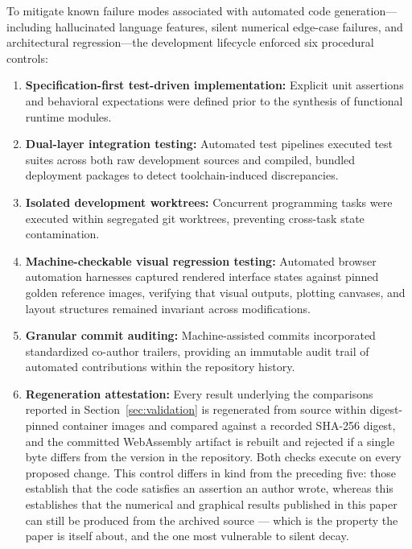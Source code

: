 \documentclass[3p,times,authoryear,twocolumn]{elsarticle}
\begin{document}
To mitigate known failure modes associated with automated code generation—including hallucinated language features, silent numerical edge-case failures, and architectural regression—the development lifecycle enforced six procedural controls:
\begin{enumerate}
\item \textbf{Specification-first test-driven implementation:} Explicit unit assertions and behavioral expectations were defined prior to the synthesis of functional runtime modules.
\item \textbf{Dual-layer integration testing:} Automated test pipelines executed test suites across both raw development sources and compiled, bundled deployment packages to detect toolchain-induced discrepancies.
\item \textbf{Isolated development worktrees:} Concurrent programming tasks were executed within segregated git worktrees, preventing cross-task state contamination.
\item \textbf{Machine-checkable visual regression testing:} Automated browser automation harnesses captured rendered interface states against pinned golden reference images, verifying that visual outputs, plotting canvases, and layout structures remained invariant across modifications.
\item \textbf{Granular commit auditing:} Machine-assisted commits incorporated standardized co-author trailers, providing an immutable audit trail of automated contributions within the repository history.
\item \textbf{Regeneration attestation:} Every result underlying the comparisons reported in Section~\ref{sec:validation} is regenerated from source within digest-pinned container images and compared against a recorded SHA-256 digest, and the committed WebAssembly artifact is rebuilt and rejected if a single byte differs from the version in the repository. Both checks execute on every proposed change. This control differs in kind from the preceding five: those establish that the code satisfies an assertion an author wrote, whereas this establishes that the numerical and graphical results published in this paper can still be produced from the archived source --- which is the property the paper is itself about, and the one most vulnerable to silent decay.
\end{enumerate}
\end{document}
